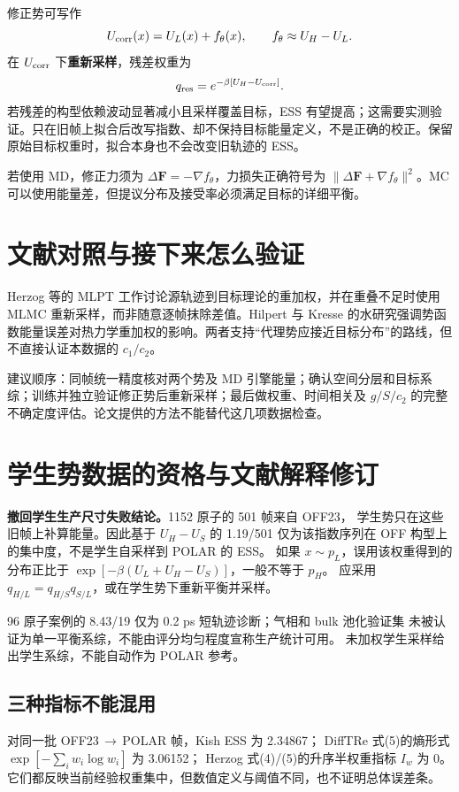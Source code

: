 \documentclass[11pt,a4paper]{article}
\begin{document}
修正势可写作
\begin{equation}
U_{\rm corr}(x)=U_L(x)+f_\theta(x),\qquad f_\theta\approx U_H-U_L.
\end{equation}
在 $U_{\rm corr}$ 下\textbf{重新采样}，残差权重为
\begin{equation}
q_{\rm res}=e^{-\beta[U_H-U_{\rm corr}]}.
\end{equation}
若残差的构型依赖波动显著减小且采样覆盖目标，ESS 有望提高；这需要实测验证。只在旧帧上拟合后改写指数、却不保持目标能量定义，不是正确的校正。保留原始目标权重时，拟合本身也不会改变旧轨迹的 ESS。

若使用 MD，修正力须为 $\Delta\mathbf F=-\nabla f_\theta$，力损失正确符号为
$\|\Delta\mathbf F+\nabla f_\theta\|^2$。MC 可以使用能量差，但提议分布及接受率必须满足目标的详细平衡。

\section{文献对照与接下来怎么验证}
Herzog 等的 MLPT 工作讨论源轨迹到目标理论的重加权，并在重叠不足时使用 MLMC 重新采样，而非随意逐帧抹除差值。Hilpert 与 Kresse 的水研究强调势函数能量误差对热力学重加权的影响。两者支持“代理势应接近目标分布”的路线，但不直接认证本数据的 $c_1/c_2$。

建议顺序：同帧统一精度核对两个势及 MD 引擎能量；确认空间分层和目标系综；训练并独立验证修正势后重新采样；最后做权重、时间相关及 $g/S/c_2$ 的完整不确定度评估。论文提供的方法不能替代这几项数据检查。


\newpage
\section{学生势数据的资格与文献解释修订}
\textbf{撤回学生生产尺寸失败结论。}1152 原子的 501 帧来自 OFF23，
学生势只在这些旧帧上补算能量。因此基于 $U_H-U_S$ 的 1.19/501
仅为该指数序列在 OFF 构型上的集中度，不是学生自采样到 POLAR 的 ESS。
如果 $x\sim p_L$，误用该权重得到的分布正比于
$\exp[-\beta(U_L+U_H-U_S)]$，一般不等于 $p_H$。
应采用 $q_{H/L}=q_{H/S}q_{S/L}$，或在学生势下重新平衡并采样。

96 原子案例的 8.43/19 仅为 0.2 ps 短轨迹诊断；气相和 bulk 池化验证集
未被认证为单一平衡系综，不能由评分均匀程度宣称生产统计可用。
未加权学生采样给出学生系综，不能自动作为 POLAR 参考。

\subsection{三种指标不能混用}
对同一批 OFF23\,$\to$\,POLAR 帧，Kish ESS 为 2.34867；
DiffTRe 式(5)的熵形式 $\exp[-\sum_iw_i\log w_i]$ 为 3.06152；
Herzog 式(4)/(5)的升序半权重指标 $I_w$ 为 0。
它们都反映当前经验权重集中，但数值定义与阈值不同，也不证明总体误差条。
\end{document}
